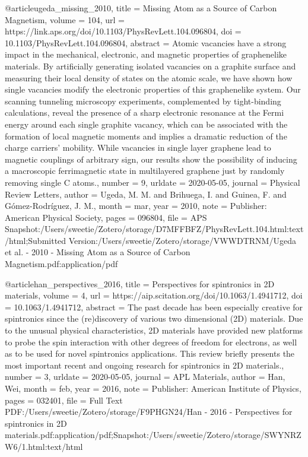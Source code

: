 {@article{ugeda_missing_2010,
	title = {Missing {Atom} as a {Source} of {Carbon} {Magnetism}},
	volume = {104},
	url = {https://link.aps.org/doi/10.1103/PhysRevLett.104.096804},
	doi = {10.1103/PhysRevLett.104.096804},
	abstract = {Atomic vacancies have a strong impact in the mechanical, electronic, and magnetic properties of graphenelike materials. By artificially generating isolated vacancies on a graphite surface and measuring their local density of states on the atomic scale, we have shown how single vacancies modify the electronic properties of this graphenelike system. Our scanning tunneling microscopy experiments, complemented by tight-binding calculations, reveal the presence of a sharp electronic resonance at the Fermi energy around each single graphite vacancy, which can be associated with the formation of local magnetic moments and implies a dramatic reduction of the charge carriers’ mobility. While vacancies in single layer graphene lead to magnetic couplings of arbitrary sign, our results show the possibility of inducing a macroscopic ferrimagnetic state in multilayered graphene just by randomly removing single C atoms.},
	number = {9},
	urldate = {2020-05-05},
	journal = {Physical Review Letters},
	author = {Ugeda, M. M. and Brihuega, I. and Guinea, F. and Gómez-Rodríguez, J. M.},
	month = mar,
	year = {2010},
	note = {Publisher: American Physical Society},
	pages = {096804},
	file = {APS Snapshot:/Users/sweetie/Zotero/storage/D7MFFBFZ/PhysRevLett.104.html:text/html;Submitted Version:/Users/sweetie/Zotero/storage/VWWDTRNM/Ugeda et al. - 2010 - Missing Atom as a Source of Carbon Magnetism.pdf:application/pdf}
}

@article{han_perspectives_2016,
	title = {Perspectives for spintronics in {2D} materials},
	volume = {4},
	url = {https://aip.scitation.org/doi/10.1063/1.4941712},
	doi = {10.1063/1.4941712},
	abstract = {The past decade has been especially creative for spintronics since the (re)discovery of various two dimensional (2D) materials. Due to the unusual physical characteristics, 2D materials have provided new platforms to probe the spin interaction with other degrees of freedom for electrons, as well as to be used for novel spintronics applications. This review briefly presents the most important recent and ongoing research for spintronics in 2D materials.},
	number = {3},
	urldate = {2020-05-05},
	journal = {APL Materials},
	author = {Han, Wei},
	month = feb,
	year = {2016},
	note = {Publisher: American Institute of Physics},
	pages = {032401},
	file = {Full Text PDF:/Users/sweetie/Zotero/storage/F9PHGN24/Han - 2016 - Perspectives for spintronics in 2D materials.pdf:application/pdf;Snapshot:/Users/sweetie/Zotero/storage/SWYNRZW6/1.html:text/html}
}

}
